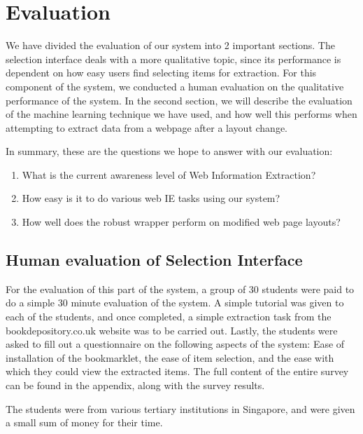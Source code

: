 \chapter{Evaluation}
\label{chap:evaluation}
We have divided the evaluation of our system into 2 important sections. The selection interface
deals with a more qualitative topic, since its performance is dependent on how easy users find 
selecting items for extraction. For this component of the system, we conducted a human
evaluation on the qualitative performance of the system. In the second section, we will describe
the evaluation of the machine learning technique we have used, and how well this performs when
attempting to extract data from a webpage after a layout change.

In summary, these are the questions we hope to answer with our evaluation:
\begin{enumerate}
	\item What is the current awareness level of Web Information Extraction?
	\item How easy is it to do various web IE tasks using our system?
	\item How well does the robust wrapper perform on modified web page layouts?
\end{enumerate}



\section{Human evaluation of Selection Interface}

For the evaluation of this part of the system, a group of 30 students were paid to do a simple 30
minute evaluation of the system. A simple tutorial was given to each of the students, and once
completed, a simple extraction task from the bookdepository.co.uk website was to be carried out.
Lastly, the students were asked to fill out a questionnaire on the following aspects of the
system: Ease of installation of the bookmarklet, the ease of item selection, and the ease with
which they could view the extracted items. The full content of the entire survey can be found in
the appendix, along with the survey results.

The students were from various tertiary institutions in Singapore, and were given a small sum of
money for their time.




